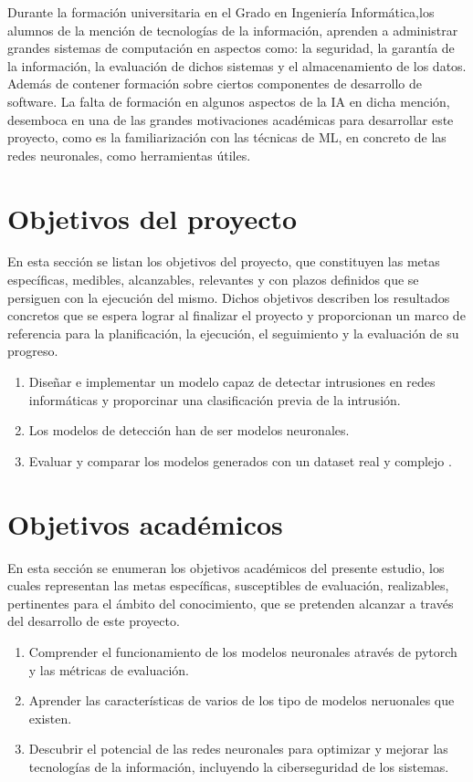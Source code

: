 Durante la formación universitaria en el Grado en Ingeniería Informática,los alumnos
de la mención de tecnologías de la información, aprenden a administrar grandes sistemas de computación en aspectos como: la seguridad, la garantía de la información, la evaluación de dichos sistemas y el almacenamiento de los datos. Además de contener formación sobre ciertos componentes de desarrollo de software. La falta de formación en algunos aspectos de la IA en dicha mención, desemboca en una de las grandes motivaciones académicas para desarrollar este proyecto, como es la familiarización con las técnicas de ML, en concreto de las redes neuronales, como herramientas útiles.

 
\section{Objetivos del proyecto} \label{sec.objetivos-pro}
En esta sección se listan los objetivos del proyecto, que constituyen las metas específicas, medibles, alcanzables, relevantes y con plazos definidos que se persiguen con la ejecución del mismo. Dichos objetivos describen los resultados concretos que se espera lograr al finalizar el proyecto y proporcionan un marco de referencia para la planificación, la ejecución, el seguimiento y la evaluación de su progreso.

\begin{enumerate}
	\item Diseñar e implementar un modelo capaz de detectar intrusiones en redes informáticas y proporcinar una clasificación previa de la intrusión.
	\item Los modelos de detección han de ser modelos neuronales.
	\item Evaluar y comparar los modelos generados con un dataset real y complejo .
\end{enumerate}

\section{Objetivos académicos} \label{sec.objetivos-aca}
En esta sección se enumeran los objetivos académicos del presente estudio, los cuales representan las metas específicas, susceptibles de evaluación, realizables, pertinentes para el ámbito del conocimiento, que se pretenden alcanzar a través del desarrollo de este proyecto. 

\begin{enumerate}
	\item Comprender el funcionamiento de los modelos neuronales através de  pytorch y las métricas de evaluación.
	\item Aprender las características de varios de los tipo de modelos neruonales que existen.
	\item Descubrir el potencial de las redes neuronales para optimizar y mejorar las tecnologías de la información, incluyendo la ciberseguridad de los sistemas.

\end{enumerate}


